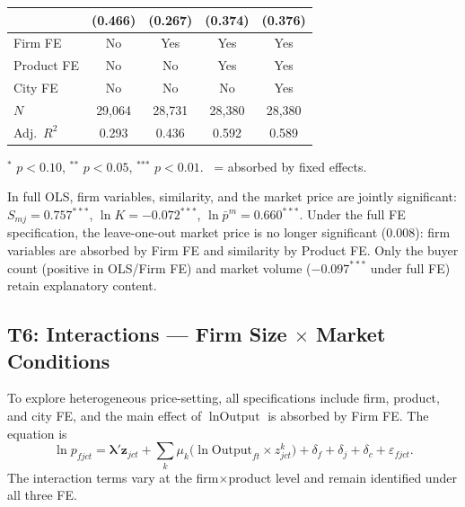 \documentclass[12pt]{article}
\newcommand{\sym}[1]{\ensuremath{^{\text{#1}}}}
\newcommand{\se}[1]{{\small(#1)}}
\newcommand{\abs}{\textemdash}
\begin{document}
\begin{landscape}
\begin{table}[H]
\begin{threeparttable}
\begin{tabular}{lcccc}
               & \se{0.466} & \se{0.267} & \se{0.374} & \se{0.376} \\
      \midrule
      Firm FE    & No  & Yes & Yes & Yes \\
      Product FE & No  & No  & Yes & Yes \\
      City FE    & No  & No  & No  & Yes \\
      \(N\)      & 29,064 & 28,731 & 28,380 & 28,380 \\
      Adj.\ \(R^2\) & 0.293 & 0.436 & 0.592 & 0.589 \\
      \bottomrule
    \end{tabular}
    \begin{tablenotes}[flushleft]
      \footnotesize
      \item \sym{*} \(p<0.10\), \sym{**} \(p<0.05\), \sym{***} \(p<0.01\).
        \abs\ = absorbed by fixed effects.
      \item In full OLS, firm variables, similarity, and the market price are
        jointly significant: \(S_{mj} = 0.757^{***}\), \(\ln K = -0.072^{***}\),
        \(\ln\bar{p}^{m} = 0.660^{***}\). Under the full FE specification, the
        leave-one-out market price is no longer significant (\(0.008\)): firm
        variables are absorbed by Firm FE and similarity by Product FE. Only the
        buyer count (positive in OLS/Firm FE) and market volume (\(-0.097^{***}\)
        under full FE) retain explanatory content.
    \end{tablenotes}
  \end{threeparttable}
\end{table}
\end{landscape}

\subsection{T6: Interactions --- Firm Size \texorpdfstring{$\times$}{x} Market Conditions}
\label{sec:t6}

To explore heterogeneous price-setting, all specifications include firm, product,
and city FE, and the main effect of \(\ln\text{Output}\) is absorbed by Firm FE.
The equation is
\begin{equation}
  \ln p_{fjct}
  = \boldsymbol{\lambda}' \mathbf{z}_{jct}
  + \sum_{k} \mu_k \bigl(\ln \text{Output}_{ft} \times z^{k}_{jct}\bigr)
  + \delta_f + \delta_j + \delta_c
  + \varepsilon_{fjct}.
  \label{eq:t6}
\end{equation}
The interaction terms vary at the firm\(\times\)product level and remain
identified under all three FE.
\end{document}
